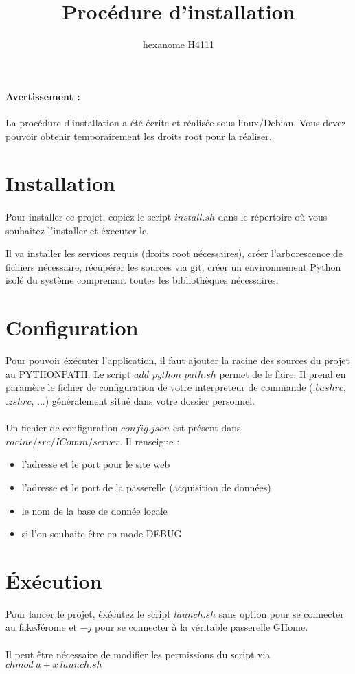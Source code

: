 \documentclass[10pt,a4paper]{article}
\author{hexanome H4111}
\title{Procédure d'installation}
\begin{document}
\paragraph{Avertissement : }La procédure d'installation a été écrite et réalisée sous linux/Debian. Vous devez pouvoir obtenir temporairement les droits root pour la réaliser.
\section{Installation}
\paragraph{} Pour installer ce projet, copiez le script $install.sh$ dans le répertoire où vous souhaitez l'installer et éxecuter le.

Il va installer les services requis (droits root nécessaires), créer l'arborescence de fichiers nécessaire, récupérer les sources via git, créer un environnement Python isolé du système comprenant toutes les bibliothèques nécessaires.

\section{Configuration}
Pour pouvoir éxécuter l'application, il faut ajouter la racine des sources du projet au PYTHONPATH. Le script $add\_python\_path.sh$ permet de le faire. Il prend en paramère le fichier de configuration de votre interpreteur de commande ($.bashrc$,$.zshrc$, ...) généralement situé dans votre dossier personnel.
\paragraph{} Un fichier de configuration $config.json$ est présent dans $racine/src/IComm/server$. Il renseigne  : 
\begin{itemize}
\item l'adresse et le port pour le site web
\item l'adresse et le port de la passerelle (acquisition de données)
\item le nom de la base de donnée locale
\item si l'on souhaite être en mode DEBUG
\end{itemize}
\section{\'{E}xécution}
Pour lancer le projet, éxécutez le script $launch.sh$ sans option pour se connecter au fakeJérome et $-j$ pour se connecter à la véritable passerelle GHome.
\paragraph{}
\begin{small}
Il peut \^{e}tre nécessaire de modifier les permissions du script via $chmod \ u+x\ launch.sh$
\end{small}
\end{document}
